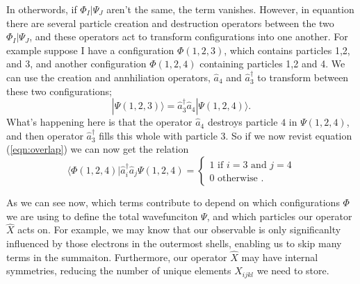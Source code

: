 \documentclass[12pt]{article}
\begin{document}
\begin{itemize}
In otherwords, if $\Phi_{I} | \Psi_{J}$ aren't the same, the term vanishes. However, in equantion 
\label{eqn:2el_expectation} there are several particle creation and destruction operators between the 
two $\Phi_{I} | \Psi_{J}$, and these operators act to transform configurations into one another. For example suppose
I have a configuration $\Phi(1,2,3)$, which contains particles 1,2, and 3, and another configuration $\Phi(1,2,4)$ 
containing particles 1,2 and 4. We can use the creation and annhiliation operators, $\hat{a}_{4}$
and $\hat{a}_{3}^{\dagger}$  to transform between these two configurations;
\begin{equation}
|\Psi(1,2,3)\rangle = \hat{a}_{3}^{\dagger}\hat{a}_{4} |\Psi(1,2,4)\rangle.
\end{equation}
What's happening here is that the operator $\hat{a}_{4}$ destroys particle $4$ in $\Psi(1,2,4)$, and then 
operator $\hat{a}^{\dagger}_{3}$ fills this whole with particle $3$. So if we now revist equation (\ref{eqn:overlap})
we can now get the relation 
\begin{equation}
\langle \Phi(1,2,4) |\hat{a}_{i}^{\dagger}\hat{a}_{j} \Psi(1,2,4) =
\begin{cases}
1 \text{\  \ \ \  \ \ \ \ if } i=3 \text{ \ \ and \ \ } j =4 \\
0 \text{ \ \ otherwise }. 
\end{cases}
\label{eqn:overlap_specific}
\end{equation}

As we can see now, which terms contribute to \label{eqn:2el_expectation} depend on which configurations $\Phi$ we are using to 
define the total wavefunciton $\Psi$, and which particles our operator $\hat{X}$ acts on. For example, we may know that 
our observable  is only significanlty influenced by those electrons in the outermost shells, enabling us to skip many terms in the 
summaiton. Furthermore, our operator $\hat{X}$ may have internal symmetries, reducing the number of unique elements $X_{ijkl}$ 
we need to store.


\end{itemize}
\end{document}

